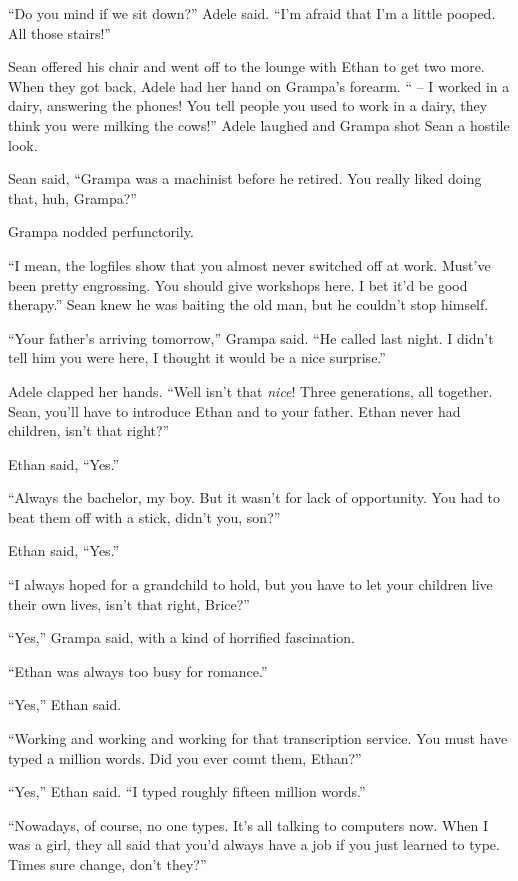 “Do you mind if we sit down?” Adele said. “I'm afraid that I'm a 
little pooped. All those stairs!”

Sean offered his chair and went off to the lounge with Ethan to get two 
more. When they got back, Adele had her hand on Grampa's forearm. “ 
-- I worked in a dairy, answering the phones! You tell people you used 
to work in a dairy, they think you were milking the cows!” Adele 
laughed and Grampa shot Sean a hostile look.

Sean said, “Grampa was a machinist before he retired. You really 
liked doing that, huh, Grampa?”

Grampa nodded perfunctorily.

“I mean, the logfiles show that you almost never switched off at 
work. Must've been pretty engrossing. You should give workshops here. I 
bet it'd be good therapy.” Sean knew he was baiting the old man, but 
he couldn't stop himself.

“Your father's arriving tomorrow,” Grampa said. “He called last 
night. I didn't tell him you were here, I thought it would be a nice 
surprise.”

Adele clapped her hands. “Well isn't that \emph{nice}! Three 
generations, all together. Sean, you'll have to introduce Ethan and  
to your father. Ethan never had children, isn't that right?”

Ethan said, “Yes.”

“Always the bachelor, my boy. But it wasn't for lack of opportunity. 
You had to beat them off with a stick, didn't you, son?”

Ethan said, “Yes.”

“I always hoped for a grandchild to hold, but you have to let your 
children live their own lives, isn't that right, Brice?”

“Yes,” Grampa said, with a kind of horrified fascination.

“Ethan was always too busy for romance.”

“Yes,” Ethan said.

“Working and working and working for that transcription service. You 
must have typed a million words. Did you ever count them, Ethan?”

“Yes,” Ethan said. “I typed roughly fifteen million words.”

“Nowadays, of course, no one types. It's all talking to computers 
now. When I was a girl, they all said that you'd always have a job if 
you just learned to type. Times sure change, don't they?”

